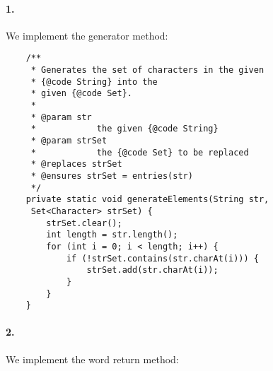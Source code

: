 \documentclass[10pt]{article}
\begin{document}
\maketitle


\paragraph{1. } We implement the generator method: 

\begin{lstlisting}
    /**
     * Generates the set of characters in the given 
     * {@code String} into the
     * given {@code Set}.
     *
     * @param str
     *            the given {@code String}
     * @param strSet
     *            the {@code Set} to be replaced
     * @replaces strSet
     * @ensures strSet = entries(str)
     */
    private static void generateElements(String str,
     Set<Character> strSet) {
        strSet.clear();
        int length = str.length();
        for (int i = 0; i < length; i++) {
            if (!strSet.contains(str.charAt(i))) {
                strSet.add(str.charAt(i));
            }
        }
    }

\end{lstlisting}

\paragraph{2. } We implement the word return method: 
\end{document}
